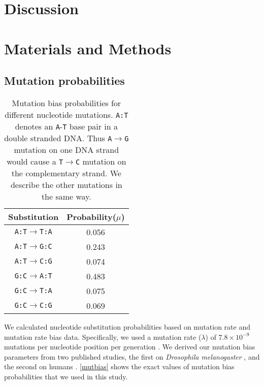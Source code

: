 \documentclass[12pt,a4paper]{article}
\begin{document}
\section*{Discussion} 


\section*{Materials and Methods}

\subsection{Mutation probabilities}

\begin{table}[H]
\centering
\begin{tabular}{c c}
\toprule
\textbf{Substitution} & Probability($\mu$) \\\midrule
\texttt{A:T}$\to$\texttt{T:A} & 0.056 \\\midrule
\texttt{A:T}$\to$\texttt{G:C} & 0.243 \\\midrule
\texttt{A:T}$\to$\texttt{C:G} & 0.074 \\\midrule
\texttt{G:C}$\to$\texttt{A:T} & 0.483 \\\midrule
\texttt{G:C}$\to$\texttt{T:A} & 0.075 \\\midrule
\texttt{G:C}$\to$\texttt{C:G} & 0.069 \\\bottomrule
\end{tabular}
\caption{Mutation bias probabilities for different nucleotide mutations. \texttt{A:T} denotes an \texttt{A}-\texttt{T} base pair in a double stranded DNA. Thus \texttt{A}$\to$\texttt{G} mutation on one DNA strand would cause a \texttt{T}$\to$\texttt{C} mutation on the complementary strand. We describe the other mutations in the same way.}
\label{mutbias}
\end{table}

We calculated nucleotide substitution probabilities based on mutation rate and mutation rate bias data. Specifically, we  used a mutation rate ($\lambda$) of $7.8\times10^{-9}$ mutations per nucleotide position per generation \citep{drosophilamutrate}. We derived our mutation bias parameters from two published studies, the first on \textit{Drosophila melanogaster} \citep{drosophilamutrate}, and the second on humans \citep{humanmutrate}. \autoref{mutbias} shows the exact values of mutation bias probabilities that we used in this study.
\end{document}
